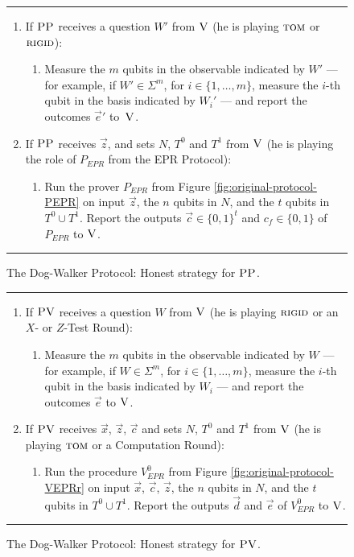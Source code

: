 \begin{figure}[H]
\rule[1ex]{\textwidth}{0.5pt}
\vspace{-20pt}
\begin{enumerate}
  \item If $\textsc{PP}$ receives a question ${W}'$ from $\textsc{V}$ (he is playing $\textsc{tom}$ or $\textsc{rigid}$):
\begin{enumerate}
     \item[]  Measure the $m$ qubits in the observable indicated by $W'$ --- for example, if $W'\in\Sigma^m$, for $i\in \{1,\ldots,m\}$, measure the $i$-th qubit in the basis indicated by $W_i'$ --- and report
       the outcomes $\vec{e}'$ to~$\textsc{V}$.
\end{enumerate}
\item If $\textsc{PP}$ receives $\vec{z}$, and sets $N$, $T^0$ and $T^1$ from $\textsc{V}$ (he is playing the role of $P_{EPR}$ from the EPR Protocol):
\begin{enumerate}
     \item[] Run the prover $P_{EPR}$ from Figure \ref{fig:original-protocol-PEPR} on input $\vec{z}$, the $n$ qubits in $N$, and the $t$ qubits in $T^0\cup T^1$.
     Report the outputs $\vec{c}\in\{0,1\}^t$ and $c_f\in\{0,1\}$ of $P_{EPR}$  to $\textsc{V}$. 
\end{enumerate}
\end{enumerate}
\rule[2ex]{\textwidth}{0.5pt}\vspace{-.5cm}
\caption{The Dog-Walker Protocol: Honest strategy for $\textsc{PP}$.}\label{fig:dogwalker-protocol-PP}
\end{figure}


\begin{figure}[H]
\rule[1ex]{\textwidth}{0.5pt}
\vspace{-20pt}
\begin{enumerate}
  \item If $\textsc{PV}$ receives a question ${W}$ from $\textsc{V}$ (he is playing $\textsc{rigid}$ or an $X$- or $Z$-Test Round):
\begin{enumerate}
     \item[]  Measure the $m$ qubits in the observable indicated by $W$ --- for example, if $W\in \Sigma^m$, for $i\in \{1,\ldots,m\}$, measure the $i$-th qubit in the basis indicated by $W_i$ --- and report the outcomes $\vec{e}$ to $\textsc{V}$.
\end{enumerate}

  \item If $\textsc{PV}$ receives $\vec{x}$, $\vec{z}$, $\vec{c}$ and sets $N$, $T^0$ and $T^1$ from $\textsc{V}$ (he is playing $\textsc{tom}$ or a Computation Round):
\begin{enumerate}
	\item[] Run the procedure $V_{EPR}^0$ from Figure \ref{fig:original-protocol-VEPRr} on input $\vec{x}$, $\vec{c}$, $\vec{z}$, the $n$ qubits in $N$, and the $t$ qubits in $T^0\cup T^1$. Report the outputs  $\vec{d}$ and $\vec{e}$ of $V_{EPR}^0$ to $\textsc{V}$.
\end{enumerate}
\end{enumerate}
\rule[2ex]{\textwidth}{0.5pt}\vspace{-.5cm}
\caption{The Dog-Walker Protocol: Honest strategy for $\textsc{PV}$.}\label{fig:dogwalker-protocol-PV}
\end{figure}


